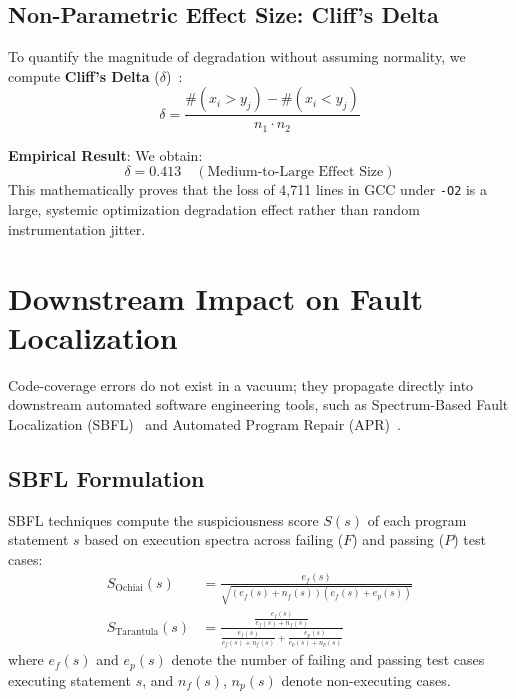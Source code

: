 \documentclass[sigconf,review,anonymous=false]{acmart}
\theoremstyle{definition}
\begin{document}
\subsection{Non-Parametric Effect Size: Cliff's Delta}
To quantify the magnitude of degradation without assuming normality, we compute \textbf{Cliff's Delta} ($\delta$)~\cite{cliff1993dominance}:
\begin{equation}
\delta = \frac{\# (x_i > y_j) - \# (x_i < y_j)}{n_1 \cdot n_2}
\end{equation}

\textbf{Empirical Result}: We obtain:
\begin{equation}
\delta = 0.413 \quad (\text{Medium-to-Large Effect Size})
\end{equation}
This mathematically proves that the loss of 4,711 lines in GCC under \texttt{-O2} is a large, systemic optimization degradation effect rather than random instrumentation jitter.

\section{Downstream Impact on Fault Localization}

Code-coverage errors do not exist in a vacuum; they propagate directly into downstream automated software engineering tools, such as Spectrum-Based Fault Localization (SBFL)~\cite{abreu2007accuracy,jones2005empirical} and Automated Program Repair (APR)~\cite{le2011genprog}.

\subsection{SBFL Formulation}
SBFL techniques compute the suspiciousness score $S(s)$ of each program statement $s$ based on execution spectra across failing ($F$) and passing ($P$) test cases:
\begin{align}
S_{\text{Ochiai}}(s) &= \frac{e_f(s)}{\sqrt{(e_f(s) + n_f(s))(e_f(s) + e_p(s))}} \\
S_{\text{Tarantula}}(s) &= \frac{\frac{e_f(s)}{e_f(s) + n_f(s)}}{\frac{e_f(s)}{e_f(s) + n_f(s)} + \frac{e_p(s)}{e_p(s) + n_p(s)}}
\end{align}
where $e_f(s)$ and $e_p(s)$ denote the number of failing and passing test cases executing statement $s$, and $n_f(s)$, $n_p(s)$ denote non-executing cases.
\end{document}
